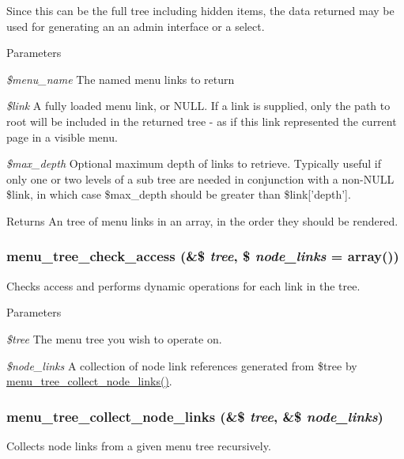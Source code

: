 Since this can be the full tree including hidden items, the data returned may be used for generating an an admin interface or a select.


\begin{DoxyParams}{Parameters}
\item[{\em \$menu\_\-name}]The named menu links to return \item[{\em \$link}]A fully loaded menu link, or NULL. If a link is supplied, only the path to root will be included in the returned tree -\/ as if this link represented the current page in a visible menu. \item[{\em \$max\_\-depth}]Optional maximum depth of links to retrieve. Typically useful if only one or two levels of a sub tree are needed in conjunction with a non-\/NULL \$link, in which case \$max\_\-depth should be greater than \$link\mbox{[}'depth'\mbox{]}.\end{DoxyParams}
\begin{DoxyReturn}{Returns}
An tree of menu links in an array, in the order they should be rendered. 
\end{DoxyReturn}
\hypertarget{group__menu_ga6374db210d96026fb70431def083a7a5}{
\subsubsection[{menu\_\-tree\_\-check\_\-access}]{\setlength{\rightskip}{0pt plus 5cm}menu\_\-tree\_\-check\_\-access (\&\$ {\em tree}, \/  \$ {\em node\_\-links} = {\ttfamily array()})}}
\label{group__menu_ga6374db210d96026fb70431def083a7a5}
Checks access and performs dynamic operations for each link in the tree.


\begin{DoxyParams}{Parameters}
\item[{\em \$tree}]The menu tree you wish to operate on. \item[{\em \$node\_\-links}]A collection of node link references generated from \$tree by \hyperlink{group__menu_ga0c9a63fbbdf8496828f1f80d37459475}{menu\_\-tree\_\-collect\_\-node\_\-links()}. \end{DoxyParams}
\hypertarget{group__menu_ga0c9a63fbbdf8496828f1f80d37459475}{
\subsubsection[{menu\_\-tree\_\-collect\_\-node\_\-links}]{\setlength{\rightskip}{0pt plus 5cm}menu\_\-tree\_\-collect\_\-node\_\-links (\&\$ {\em tree}, \/  \&\$ {\em node\_\-links})}}
\label{group__menu_ga0c9a63fbbdf8496828f1f80d37459475}
Collects node links from a given menu tree recursively.


